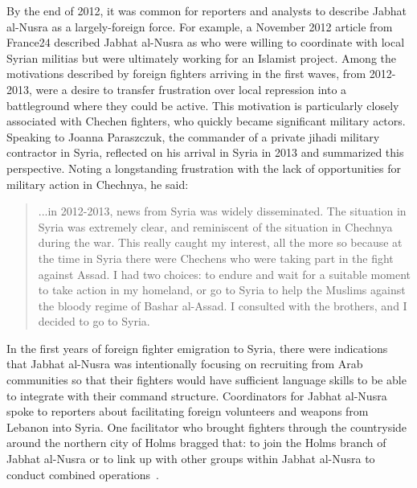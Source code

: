 By the end of 2012, it was common for reporters and analysts to describe Jabhat al-Nusra as a largely-foreign force. For example, a November 2012 article from France24 described Jabhat al-Nusra as  who were willing to coordinate with local Syrian militias but were ultimately working for an Islamist project\autocite{fvc2012jabhat}. Among the motivations described by foreign fighters arriving in the first waves, from 2012-2013, were a desire to transfer frustration over local repression into a battleground where they could be active. This motivation is particularly closely associated with Chechen fighters, who quickly became significant military actors. Speaking to Joanna Paraszczuk, the commander of a private jihadi military contractor in Syria, reflected on his arrival in Syria in 2013 and summarized this perspective. Noting a longstanding frustration with the lack of opportunities for military action in Chechnya, he said:

\begin{quote}...in 2012-2013, news from Syria was widely disseminated. The situation in Syria was extremely clear, and reminiscent of the situation in Chechnya during the war. This really caught my interest, all the more so because at the time in Syria there were Chechens who were taking part in the fight against Assad. I had two choices: to endure and wait for a suitable moment to take action in my homeland, or go to Syria to help the Muslims against the bloody regime of Bashar al-Assad. I consulted with the brothers, and I decided to go to Syria. \autocite{paraszczuk2019ali}\end{quote}

In the first years of foreign fighter emigration to Syria, there were indications that Jabhat al-Nusra was intentionally focusing on recruiting from Arab communities so that their fighters would have sufficient language skills to be able to integrate with their command structure. 
Coordinators for Jabhat al-Nusra spoke to reporters about facilitating foreign volunteers and weapons from Lebanon into Syria. One facilitator who brought fighters through the countryside around the northern city of Holms bragged that:  to join the Holms branch of Jabhat al-Nusra or to link up with other groups within Jabhat al-Nusra to conduct combined operations~\autocite{sherlock2012inside}. 

